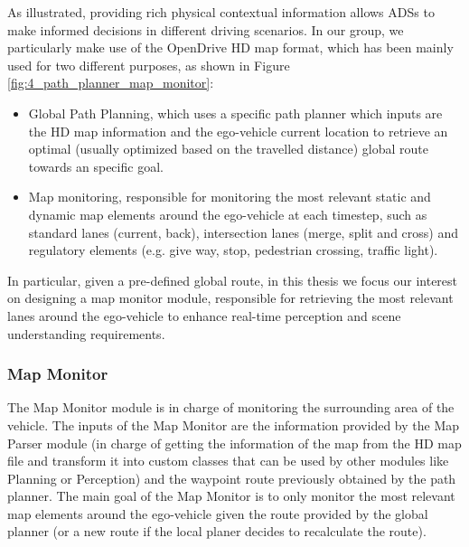 As illustrated, providing rich physical contextual information allows \acp{ADS} to make informed decisions in different driving scenarios. In our group, we particularly make use of the OpenDrive \cite{dupuis2010opendrive} HD map format, which has been mainly used for two different purposes, as shown in Figure \ref{fig:4_path_planner_map_monitor}:

\begin{itemize}
	\item Global Path Planning, which uses a specific path planner which inputs are the HD map information and the ego-vehicle current location to retrieve an optimal (usually optimized based on the travelled distance) global route towards an specific goal.
	\item Map monitoring, responsible for monitoring the most relevant static and dynamic map elements around the ego-vehicle at each timestep, such as standard lanes (current, back), intersection lanes (merge, split and cross) and regulatory elements (e.g. give way, stop, pedestrian crossing, traffic light).
\end{itemize}

In particular, given a pre-defined global route, in this thesis we focus our interest on designing a map monitor module, responsible for retrieving the most relevant lanes around the ego-vehicle to enhance real-time perception and scene understanding requirements.

\subsubsection{Map Monitor}
\label{subsubsec:4_smartmot_mapmonitor}

The Map Monitor module is in charge of monitoring the surrounding area of the vehicle. The inputs of the Map Monitor are the information provided by the Map Parser module (in charge of getting the information of the map from the HD map file and transform it into custom classes that can be used by other modules like Planning or Perception) and the waypoint route previously obtained by the path planner. The main goal of the Map Monitor is to only monitor the most relevant map elements around the ego-vehicle given the route provided by the global planner (or a new route if the local planer decides to recalculate the route). 

